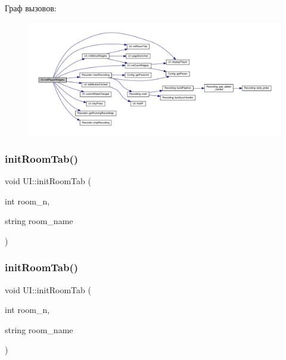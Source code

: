Граф вызовов\+:\nopagebreak
\begin{figure}[H]
\begin{center}
\leavevmode
\includegraphics[width=350pt]{class_u_i_a85a2b2c92c5d2017f50886f7a184ddd1_cgraph}
\end{center}
\end{figure}
\mbox{\label{class_u_i_ab66596071cbc18cb463b8a99266c7926}} 
\subsubsection{\texorpdfstring{init\+Room\+Tab()}{initRoomTab()}\hspace{0.1cm}{\footnotesize\ttfamily [1/2]}}
{\footnotesize\ttfamily void U\+I\+::init\+Room\+Tab (\begin{DoxyParamCaption}\item[{int}]{room\+\_\+n,  }\item[{string}]{room\+\_\+name }\end{DoxyParamCaption})\hspace{0.3cm}{\ttfamily [private]}}

\mbox{\label{class_u_i_ab66596071cbc18cb463b8a99266c7926}} 
\subsubsection{\texorpdfstring{init\+Room\+Tab()}{initRoomTab()}\hspace{0.1cm}{\footnotesize\ttfamily [2/2]}}
{\footnotesize\ttfamily void U\+I\+::init\+Room\+Tab (\begin{DoxyParamCaption}\item[{int}]{room\+\_\+n,  }\item[{string}]{room\+\_\+name }\end{DoxyParamCaption})\hspace{0.3cm}{\ttfamily [private]}}

